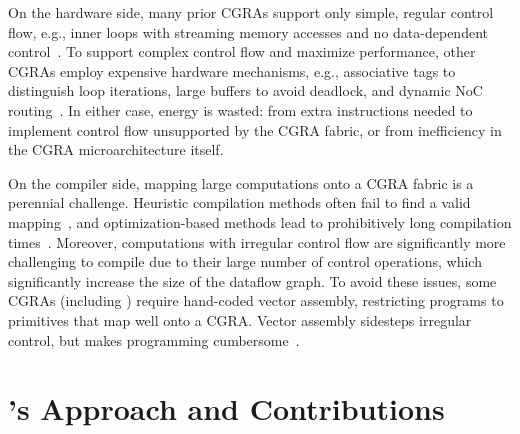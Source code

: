 On the hardware side,
%
many prior CGRAs support only simple, regular control flow,
e.g., inner loops with streaming memory accesses
and no data-dependent control~\cite{plasticine,nowatzki:isca17:stream-dataflow,snafu}.
%
To support complex control flow and maximize performance, other CGRAs employ expensive hardware mechanisms, e.g.,
associative tags to distinguish loop iterations,
large buffers to avoid deadlock,
and dynamic NoC routing~\cite{monsoon,ttda,swanson2003wavescalar,voitsechov2014single}.
%
%
In either case, energy is wasted:
%
from extra instructions needed to implement control flow unsupported
by the CGRA fabric,
%
or from inefficiency in the CGRA microarchitecture itself.


On the compiler side, mapping large computations onto a CGRA fabric is a 
perennial challenge.
%
Heuristic compilation methods often fail to find a valid
mapping~\cite{chlorophyll,nowatzki2018hybrid}, and optimization-based methods lead to
prohibitively long compilation times~\cite{nowatzki2018hybrid,cgrame-ilp}.
%
Moreover, computations with irregular control flow are significantly
more challenging to compile due to their large number of control
operations, which significantly increase the size of the dataflow
graph.
%
To avoid these issues, some CGRAs (including \snafu) require
hand-coded vector assembly, restricting programs to
primitives that map well onto a CGRA.
%
Vector assembly sidesteps irregular control,
but makes programming cumbersome~\cite{snafu,yang2021spzip,nowatzki:isca17:stream-dataflow}.


\section*{\riptide's Approach and Contributions}


